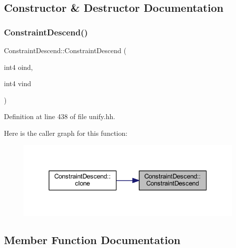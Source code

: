\subsection{Constructor \& Destructor Documentation}
\mbox{\label{class_constraint_descend_a6698de6b07d6a1134f180d95204c3e2a}} 
\subsubsection{\texorpdfstring{ConstraintDescend()}{ConstraintDescend()}}
{\footnotesize\ttfamily Constraint\+Descend\+::\+Constraint\+Descend (\begin{DoxyParamCaption}\item[{int4}]{oind,  }\item[{int4}]{vind }\end{DoxyParamCaption})\hspace{0.3cm}{\ttfamily [inline]}}



Definition at line 438 of file unify.\+hh.

Here is the caller graph for this function\+:
\nopagebreak
\begin{figure}[H]
\begin{center}
\leavevmode
\includegraphics[width=326pt]{class_constraint_descend_a6698de6b07d6a1134f180d95204c3e2a_icgraph}
\end{center}
\end{figure}


\subsection{Member Function Documentation}
\mbox{\label{class_constraint_descend_a33fc5eaf61c61ab08d27dffe051dd2e6}} 
